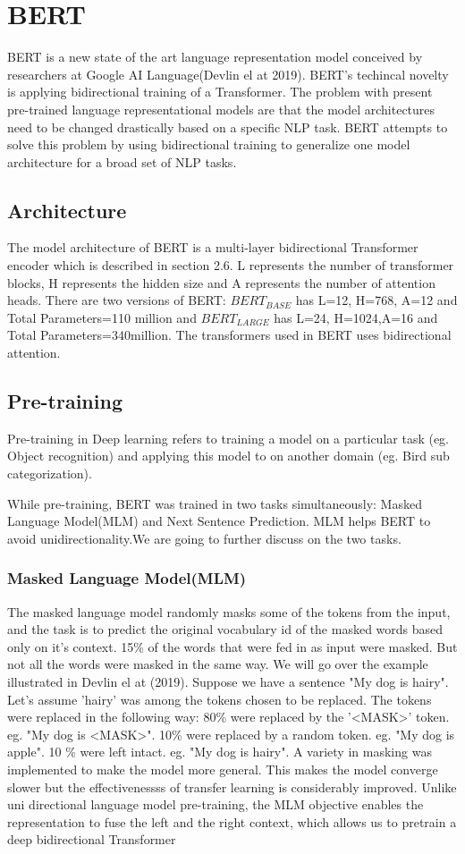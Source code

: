 \documentclass[12pt,a4paper]{article}
\numberwithin{equation}{section}
\begin{document}
\section{BERT}
BERT is a new state of the art language representation model conceived by researchers at Google AI Language(Devlin el at 2019). BERT's techincal novelty is applying bidirectional training of a Transformer.  The problem with present pre-trained language representational models are that the model architectures need to be changed drastically based on a specific NLP task. BERT attempts to solve this problem by using bidirectional training to generalize one model architecture for a broad set of NLP tasks. 
\subsection{Architecture}
The model architecture of BERT is a multi-layer bidirectional Transformer encoder which is described in section 2.6. L represents the number of transformer blocks, H represents the hidden size and A represents the number of attention heads. There are two versions of BERT: $BERT_{BASE}$ has L=12, H=768, A=12 and Total Parameters=110 million and $BERT_{LARGE}$ has L=24, H=1024,A=16 and Total Parameters=340million. The transformers used in BERT uses bidirectional attention. 
\subsection{Pre-training}
Pre-training in Deep learning refers to training a model on a particular task (eg. Object recognition) and applying this model to on another domain (eg. Bird sub categorization).

While pre-training, BERT was trained in two tasks simultaneously: Masked Language Model(MLM) and Next Sentence Prediction. MLM helps BERT to avoid unidirectionality.We are going to further discuss on the two tasks. 
\subsubsection{Masked Language Model(MLM)}
The masked language model randomly masks some of the tokens from the input, and the task is to predict the original vocabulary id of the masked words based only on it's context. 15\% of the words that were fed in as input were masked. But not all the words were masked in the same way. We will go over the example illustrated in Devlin el at (2019). Suppose we have a sentence "My dog is hairy". Let's assume 'hairy' was among the tokens chosen to be replaced. The tokens were replaced in the following way:  80\% were replaced by the '<MASK>' token. eg. "My dog is <MASK>". 10\% were replaced by a random token. eg. "My dog is apple". 10 \% were left intact. eg. "My dog is hairy". A variety in masking was implemented to make the model more general. This makes the model converge slower but the effectivenessss of transfer learning is considerably improved.  Unlike uni directional language model pre-training, the MLM objective enables the representation to fuse the left
and the right context, which allows us to pretrain a deep bidirectional Transformer 
\end{document}
